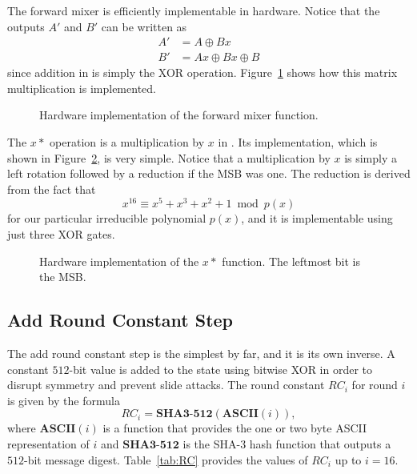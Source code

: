 The forward mixer is efficiently implementable in hardware.
Notice that the outputs $A'$ and $B'$ can be written as
\begin{align*}
A' &= A \oplus Bx \\
B' &= Ax \oplus Bx \oplus B
\end{align*}
since addition in \gfsixteen is simply the XOR operation.
Figure~\ref{fig:MixerMatrix} shows how this matrix multiplication is implemented.

\begin{figure}[ht]
\centering

\caption{Hardware implementation of the forward mixer function.}
\label{fig:MixerMatrix}
\end{figure}

The $x*$ operation is a multiplication by $x$ in \gfsixteen.
Its implementation, which is shown in Figure~\ref{fig:xTimes}, is very simple. 
Notice that a multiplication by $x$ is simply a left rotation followed by a reduction if the MSB was one.
The reduction is derived from the fact that
\begin{equation*}
x^{16} \equiv x^5 + x^3 + x^2 + 1 \bmod{p(x)}
\end{equation*}
for our particular irreducible polynomial $p(x)$, and it is implementable using just three XOR gates.

\begin{figure}[ht]
\centering

\caption{Hardware implementation of the $x*$ function. The leftmost bit is the MSB.}
\label{fig:xTimes}
\end{figure}

\subsection{Add Round Constant Step}
The add round constant step is the simplest by far, and it is its own inverse.
A constant $512$-bit value is added to the state using bitwise XOR in order to disrupt symmetry and prevent slide attacks.
The round constant $RC_i$ for round $i$ is given by the formula
\begin{equation*}
RC_i = \mathbf{SHA3\textbf{-}512}(\mathbf{ASCII}(i)),
\end{equation*}
where $\mathbf{ASCII}(i)$ is a function that provides the one or two byte ASCII representation of $i$ and $\mathbf{SHA3\textbf{-}512}$ is the SHA-3 hash function that outputs a $512$-bit message digest. 
Table~\ref{tab:RC} provides the values of $RC_i$ up to $i = 16$.

